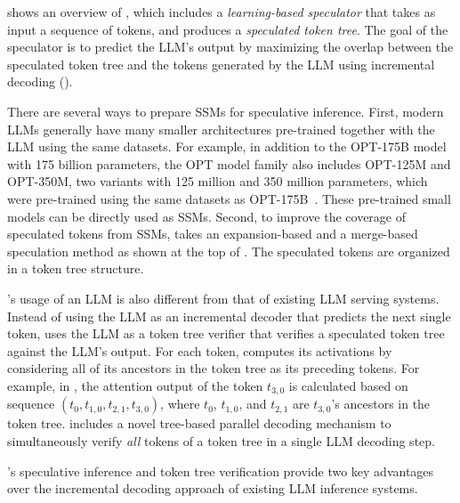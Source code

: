  shows an overview of \SpecInfer, which
includes a {\em learning-based speculator} that takes as input a sequence of tokens, and produces a {\em speculated token tree}.
The goal of the speculator is to predict the LLM's output by maximizing the overlap between the speculated token tree and the tokens generated by the LLM using incremental decoding ().

There are several ways to prepare SSMs for speculative inference.
First, modern LLMs generally have many smaller architectures pre-trained together with the LLM using the same datasets.
For example, in addition to the OPT-175B model with 175 billion parameters, the OPT model family also includes OPT-125M and OPT-350M, two variants with 125 million and 350 million parameters, which were pre-trained using the same datasets as OPT-175B~\cite{zhang2022opt}.
These pre-trained small models can be directly used as SSMs.
Second, to improve the coverage of speculated tokens from SSMs, \SpecInfer takes an expansion-based and a merge-based speculation method as shown at the top of . The speculated tokens are organized in a token tree structure.

\SpecInfer's usage of an LLM is also different from that of existing LLM serving systems.
Instead of using the LLM as an incremental decoder that predicts the next single token, \SpecInfer uses the LLM as a token tree verifier that verifies a speculated token tree against the LLM's output.
For each token, \SpecInfer computes its activations by considering all of its ancestors in the token tree as its preceding tokens.
For example, in , the attention output of the token $t_{3,0}$ is calculated based on sequence $(t_0, t_{1,0}, t_{2, 1}, t_{3,0})$, where $t_0$, $t_{1,0}$, and $t_{2,1}$ are $t_{3,0}$'s ancestors in the token tree.
\SpecInfer includes a novel tree-based parallel decoding mechanism to simultaneously verify {\em all} tokens of a token tree in a single LLM decoding step.

\SpecInfer's speculative inference and token tree verification provide two key advantages over the incremental decoding approach of existing LLM inference systems.

